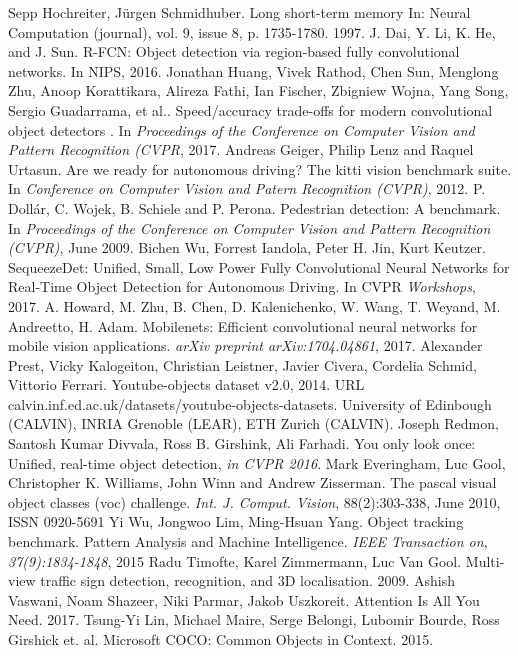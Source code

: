 \documentclass[conference]{IEEEtran}
\begin{document}
\begin{thebibliography}{00}
 Sepp Hochreiter, Jürgen Schmidhuber. Long short-term memory In: Neural Computation (journal), vol. 9, issue 8, p. 1735-1780. 1997.
 J. Dai, Y. Li, K. He, and J. Sun. R-FCN: Object detection via
region-based fully convolutional networks. In NIPS, 2016.
 Jonathan Huang, Vivek Rathod, Chen Sun, Menglong Zhu, Anoop Korattikara, Alireza Fathi, Ian Fischer, Zbigniew Wojna, Yang Song, Sergio Guadarrama, et al.. Speed/accuracy trade-offs for modern convolutional object detectors . In \textit{Proceedings of the Conference on Computer Vision and Pattern Recognition (CVPR}, 2017.
 Andreas Geiger, Philip Lenz and Raquel Urtasun. Are we ready for autonomous driving? The kitti vision benchmark suite. In \textit{Conference on Computer Vision and Patern Recognition (CVPR)}, 2012.
 P. Dollár, C. Wojek, B. Schiele and P. Perona. Pedestrian detection: A benchmark. In \textit{Proceedings of the Conference on Computer Vision and Pattern Recognition (CVPR)}, June 2009.
 Bichen Wu, Forrest Iandola, Peter H. Jin, Kurt Keutzer. SequeezeDet: Unified, Small, Low Power Fully Convolutional Neural Networks for Real-Time Object Detection for Autonomous Driving. In CVPR \textit{Workshops}, 2017.
 A. Howard, M. Zhu, B. Chen, D. Kalenichenko, W. Wang, T. Weyand, M. Andreetto, H. Adam. Mobilenets: Efficient convolutional neural networks for mobile vision applications. \textit{arXiv preprint arXiv:1704.04861}, 2017.
 Alexander Prest, Vicky Kalogeiton, Christian Leistner, Javier Civera, Cordelia Schmid, Vittorio Ferrari. Youtube-objects dataset v2.0, 2014. URL calvin.inf.ed.ac.uk/datasets/youtube-objects-datasets. University of Edinbough (CALVIN), INRIA Grenoble (LEAR), ETH Zurich (CALVIN). 
 Joseph Redmon, Santosh Kumar Divvala, Ross B. Girshink, Ali Farhadi. You only look once: Unified, real-time object detection, \textit{in CVPR 2016}.
 Mark Everingham, Luc Gool, Christopher K. Williams, John Winn and Andrew Zisserman. The pascal visual object classes (voc) challenge. \textit{Int. J. Comput. Vision}, 88(2):303-338, June 2010, ISSN 0920-5691
 Yi Wu, Jongwoo Lim, Ming-Hsuan Yang. Object tracking benchmark. Pattern Analysis and Machine Intelligence. \textit{IEEE Transaction on, 37(9):1834-1848}, 2015
 Radu Timofte, Karel Zimmermann, Luc Van Gool. Multi-view traffic sign detection, recognition, and 3D localisation. 2009.
 Ashish Vaswani, Noam Shazeer, Niki Parmar, Jakob Uszkoreit. Attention Is All You Need. 2017.
 Tsung-Yi Lin, Michael Maire, Serge Belongi, Lubomir Bourde, Ross Girshick et. al. Microsoft COCO: Common Objects in Context. 2015.

\end{thebibliography}
\end{document}
